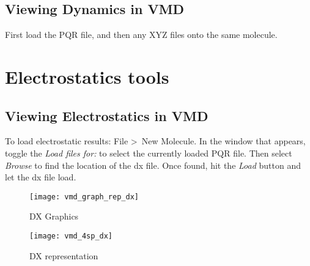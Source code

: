 \subsection{Viewing Dynamics in VMD}

First load the PQR file, and then any XYZ files onto the same molecule.

\section{Electrostatics tools}
\subsection{Viewing Electrostatics in VMD}

To load electrostatic results: File \textgreater \, New Molecule. In the window that appears, toggle the \textit{Load files for:} 
to select the currently loaded PQR file. Then select \textit{Browse} to find the location of the dx file. Once found, hit 
the \textit{Load} button and let the dx file load.

\begin{figure}[!htbp]
  \centering
  \begin{minipage}[b]{0.3\textwidth}
    \texttt{[image: vmd\_graph\_rep\_dx]}
    \caption{DX Graphics}
  \end{minipage}
  \hfill
  \begin{minipage}[b]{0.65\textwidth}
    \texttt{[image: vmd\_4sp\_dx]}
    \caption{DX representation}
  \end{minipage}
\end{figure}

 \clearpage

%
%
%


